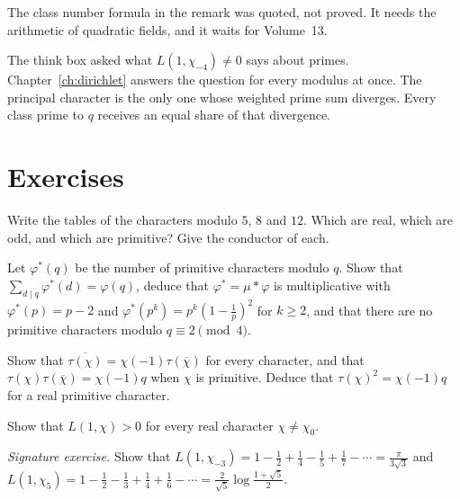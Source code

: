 The class number formula in the remark was quoted, not proved. It needs the arithmetic of quadratic fields, and it waits for Volume~13.

The think box asked what $L(1,\chi_{-4})\ne0$ says about primes. Chapter~\ref{ch:dirichlet} answers the question for every modulus at once. The principal character is the only one whose weighted prime sum diverges. Every class prime to $q$ receives an equal share of that divergence.

\section{Exercises}

\begin{exercise}[$\star$]\label{ex:chartables}
Write the tables of the characters modulo $5$, $8$ and $12$. Which are real, which are odd, and which are primitive? Give the conductor of
each.
\end{exercise}

\begin{exercise}[$\star\star$]\label{ex:primcount}
Let $\varphi^*(q)$ be the number of primitive characters modulo $q$. Show that $\sum_{d\mid q}\varphi^*(d)=\varphi(q)$, deduce that $\varphi^*=\mu*\varphi$ is multiplicative
with $\varphi^*(p)=p-2$ and $\varphi^*(p^k)=p^k(1-\frac1p)^2$ for $k\ge2$, and that there are no primitive characters modulo $q\equiv2\pmod4$.
\end{exercise}

\begin{exercise}[$\star\star$]\label{ex:gausssquare}
Show that $\overline{\tau(\chi)}=\chi(-1)\tau(\overline\chi)$ for every character, and that $\tau(\chi)\tau(\overline\chi)=\chi(-1)q$ when $\chi$ is primitive. Deduce that
$\tau(\chi)^2=\chi(-1)q$ for a real primitive character.
\end{exercise}

\begin{exercise}[$\star$]\label{ex:lpositive}
Show that $L(1,\chi)>0$ for every real character $\chi\ne\chi_0$.
\end{exercise}

\begin{exercise}[$\star\star$]\label{ex:l1values}
\emph{Signature exercise.} Show that $L(1,\chi_{-3})=1-\frac12+\frac14-\frac15+\frac17-\cdots=\frac\pi{3\sqrt3}$ and
$L(1,\chi_5)=1-\frac12-\frac13+\frac14+\frac16-\cdots=\frac2{\sqrt5}\log\frac{1+\sqrt5}2$.
\end{exercise}

